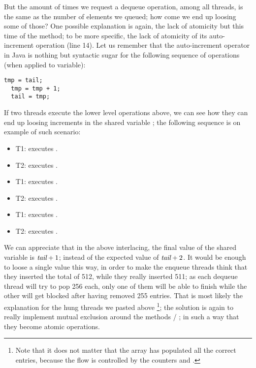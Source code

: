 But the amount of times we request a dequeue operation, among all
threads, is the same as the number of elements we queued; how come we
end up loosing some of those? One possible explanation is again, the
lack of atomicity but this time of the  method; to be more
specific, the lack of atomicity of its auto-increment operation 
 (line 14). Let us remember that the auto-increment
operator in Java is nothing but syntactic sugar for the following
sequence of operations (when applied to  variable): \\

\begin{lstlisting}[style=nonumbers]
  tmp = tail;
  tmp = tmp + 1;
  tail = tmp;
\end{lstlisting} 
\hfill

If two threads execute the lower level operations above, we can see
how they can end up loosing increments in the shared variable
; the following sequence is on example of such scenario:

\begin{itemize}
\item T1: executes .
\item T2: executes .
\item T1: executes .
\item T2: executes .
\item T1: executes .
\item T2: executes .
\end{itemize}
\hfill

We can appreciate that in the above interlacing, the final value of
the shared variable is $\emph{tail} + 1$; instead of the expected value
of $\emph{tail} + 2$. It would be enough to loose a single value this
way, in order to make the enqueue threads think that they inserted the
total of 512, while they really inserted 511; as each dequeue thread
will try to pop 256 each, only one of them will be able to finish
while the other will get blocked after having removed 255
entries. That is most likely the explanation for the hung threads we
pasted above \footnote{Note that it does not matter that the array
   has populated all the correct entries, because the flow is
  controlled by the counters  and .}; the solution is
again to really implement mutual 
exclusion around the methods  / ; in such a way that
they become atomic operations.

